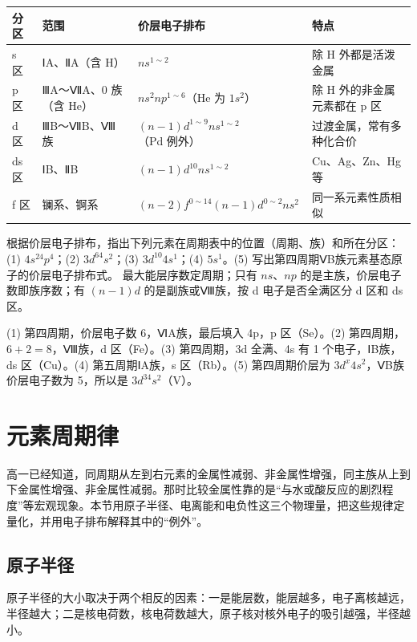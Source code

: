 \begin{center}
\begin{minipage}{\linewidth}\centering\small
{}\label{tab:06-block}
\begin{tabular}{llll}
\toprule
分区 & 范围 & 价层电子排布 & 特点 \\
\midrule
s 区 & ⅠA、ⅡA（含 H） & $ns^{1\sim2}$ & 除 H 外都是活泼金属 \\
p 区 & ⅢA～ⅦA、0 族（含 He） & $ns^2np^{1\sim6}$（He 为 $1s^2$） & 除 H 外的非金属元素都在 p 区 \\
d 区 & ⅢB～ⅦB、Ⅷ族 & $(n-1)d^{1\sim9}ns^{1\sim2}$（Pd 例外） & 过渡金属，常有多种化合价 \\
ds 区 & ⅠB、ⅡB & $(n-1)d^{10}ns^{1\sim2}$ & Cu、Ag、Zn、Hg 等 \\
f 区 & 镧系、锕系 & $(n-2)f^{0\sim14}(n-1)d^{0\sim2}ns^2$ & 同一系元素性质相似 \\
\bottomrule
\end{tabular}
\end{minipage}
\end{center}

\begin{liti}[基础]
根据价层电子排布，指出下列元素在周期表中的位置（周期、族）和所在分区：(1) $4s^24p^4$；(2) $3d^64s^2$；(3) $3d^{10}4s^1$；(4) $5s^1$。(5) 写出第四周期ⅤB族元素基态原子的价层电子排布式。
\tcblower
\silu 最大能层序数定周期；只有 $ns$、$np$ 的是主族，价层电子数即族序数；有 $(n-1)d$ 的是副族或Ⅷ族，按 d 电子是否全满区分 d 区和 ds 区。\par
\jie (1) 第四周期，价层电子数 6，ⅥA族，最后填入 4p，p 区（Se）。(2) 第四周期，$6+2=8$，Ⅷ族，d 区（Fe）。(3) 第四周期，3d 全满、4s 有 1 个电子，ⅠB族，ds 区（Cu）。(4) 第五周期ⅠA族，s 区（Rb）。(5) 第四周期价层为 $3d^x4s^2$，ⅤB族价层电子数为 5，所以是 $3d^34s^2$（V）。
\end{liti}

\section{元素周期律}
高一已经知道，同周期从左到右元素的金属性减弱、非金属性增强，同主族从上到下金属性增强、非金属性减弱。那时比较金属性靠的是“与水或酸反应的剧烈程度”等宏观现象。本节用原子半径、电离能和电负性这三个物理量，把这些规律定量化，并用电子排布解释其中的“例外”。

\subsection{原子半径}
原子半径的大小取决于两个相反的因素：一是能层数，能层越多，电子离核越远，半径越大；二是核电荷数，核电荷数越大，原子核对核外电子的吸引越强，半径越小。

